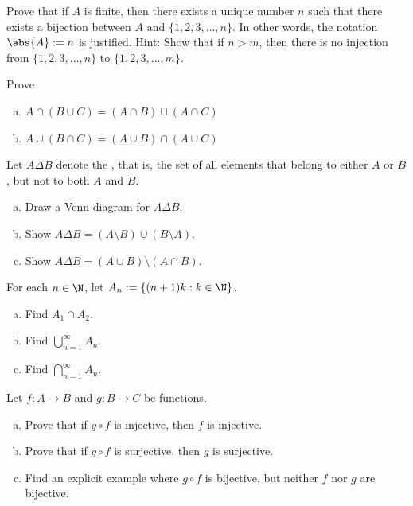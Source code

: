 \documentclass[12pt]{book}
\begin{document}
\begin{exercise}[Tricky]
Prove that if $A$ is finite, then there exists a unique number $n$ such
that there exists a bijection between $A$ and $\{ 1, 2, 3, \ldots, n \}$.
In other words, the notation $\abs{A} := n$ is justified.
Hint: Show that if $n > m$, then there is no injection from
$\{ 1, 2, 3, \ldots, n \}$ to
$\{ 1, 2, 3, \ldots, m \}$.
\end{exercise}


\begin{exercise}
Prove
\begin{enumerate}[a)]
\item $A \cap (B \cup C) = (A \cap B) \cup (A \cap C)$
\item $A \cup (B \cap C) = (A \cup B) \cap (A \cup C)$
\end{enumerate}
\end{exercise}

\begin{exercise}
Let $A \Delta B$ denote the
\emph{}, that is, the set of all elements that
belong to either $A$ or $B$, but not to both $A$ and $B$.
\begin{enumerate}[a)]
\item
Draw a Venn diagram for
$A \Delta B$.
\item
Show $A \Delta B = (A \setminus B) \cup (B \setminus A)$.
\item
Show $A \Delta B = (A \cup B) \setminus ( A \cap B)$.
\end{enumerate}
\end{exercise}

\begin{exercise}
For each $n \in \N$, let $A_n := \{ (n+1)k : k \in \N \}$.
\begin{enumerate}[a)]
\item Find $A_1 \cap A_2$.
\item Find $\bigcup_{n=1}^\infty A_n$.
\item Find $\bigcap_{n=1}^\infty A_n$.
\end{enumerate}
\end{exercise}

\begin{exercise}
Let $f \colon A \to B$ and $g \colon B \to C$ be functions.
\begin{enumerate}[a)]
\item
Prove that if $g \circ f$ is injective, then $f$ is injective.
\item
Prove that if $g \circ f$ is surjective, then $g$ is surjective.
\item
Find an explicit example where $g \circ f$ is bijective, but neither $f$
nor $g$ are bijective.
\end{enumerate}
\end{exercise}
\end{document}
